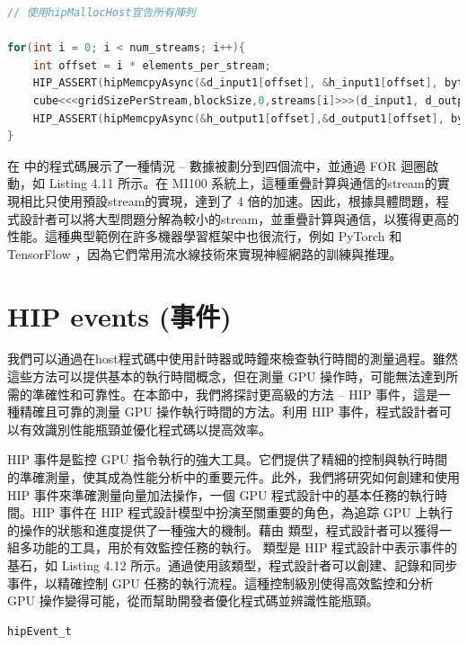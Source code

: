\begin{lstlisting}[language=C, caption={使用HIP streams呈現重疊計算與通信的host端程式碼}, label={11th:example}]
// 使用hipMallocHost宣告所有陣列

for(int i = 0; i < num_streams; i++){
    int offset = i * elements_per_stream;
    HIP_ASSERT(hipMemcpyAsync(&d_input1[offset], &h_input1[offset], bytes_per_stream, hipMemcpyHostToDevice, stream[i]);
    cube<<<gridSizePerStream,blockSize,0,streams[i]>>>(d_input1, d_output1,offset);
    HIP_ASSERT(hipMemcpyAsync(&h_output1[offset],&d_output1[offset], bytes_per_stream, hipMemcpyDeviceToHost,streams[i]));
}
\end{lstlisting}

在 中的程式碼展示了一種情況 -- 數據被劃分到四個流中，並通過 FOR 迴圈啟動，如 Listing 4.11 所示。在 MI100 系統上，這種重疊計算與通信的stream的實現相比只使用預設stream的實現，達到了 4 倍的加速。因此，根據具體問題，程式設計者可以將大型問題分解為較小的stream，並重疊計算與通信，以獲得更高的性能。這種典型範例在許多機器學習框架中也很流行，例如 PyTorch \cite{paszke2019pytorch} 和 TensorFlow \cite{abadi2016tensorflow}，因為它們常用流水線技術來實現神經網路的訓練與推理。

\section{HIP events (事件)}
我們可以通過在host程式碼中使用計時器或時鐘來檢查執行時間的測量過程。雖然這些方法可以提供基本的執行時間概念，但在測量 GPU 操作時，可能無法達到所需的準確性和可靠性。在本節中，我們將探討更高級的方法 -- HIP 事件，這是一種精確且可靠的測量 GPU 操作執行時間的方法。利用 HIP 事件，程式設計者可以有效識別性能瓶頸並優化程式碼以提高效率。

HIP 事件是監控 GPU 指令執行的強大工具。它們提供了精細的控制與執行時間的準確測量，使其成為性能分析中的重要元件。此外，我們將研究如何創建和使用 HIP 事件來準確測量向量加法操作，一個 GPU 程式設計中的基本任務的執行時間。HIP 事件在 HIP 程式設計模型中扮演至關重要的角色，為追踪 GPU 上執行的操作的狀態和進度提供了一種強大的機制。藉由 類型，程式設計者可以獲得一組多功能的工具，用於有效監控任務的執行。 類型是 HIP 程式設計中表示事件的基石，如 Listing 4.12 所示。通過使用該類型，程式設計者可以創建、記錄和同步事件，以精確控制 GPU 任務的執行流程。這種控制級別使得高效監控和分析 GPU 操作變得可能，從而幫助開發者優化程式碼並辨識性能瓶頸。

\begin{lstlisting}[language=C, caption={使用hipEvent\_t 型別}, label={12th:example}]
hipEvent_t
\end{lstlisting}

